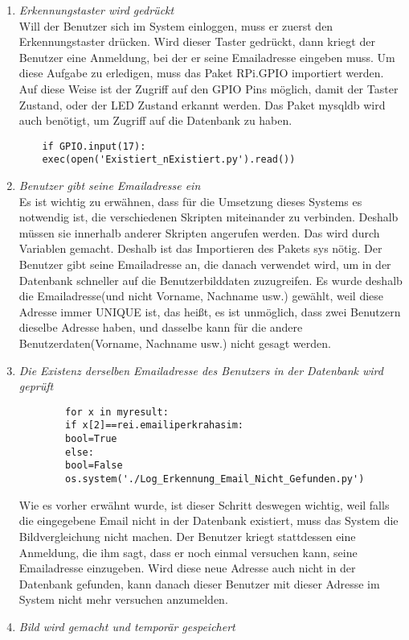 \begin{enumerate}
	
	\item \textit{Erkennungstaster wird gedr{\"u}ckt} \\
	
	Will der Benutzer sich im System einloggen, muss er zuerst den Erkennungstaster dr{\"u}cken. Wird dieser Taster gedr{\"u}ckt, dann kriegt der Benutzer eine Anmeldung, bei der er seine Emailadresse eingeben muss. Um diese Aufgabe zu erledigen, muss das Paket RPi.GPIO importiert werden. Auf diese Weise ist der Zugriff auf den GPIO Pins m{\"o}glich, damit der Taster Zustand, oder der LED Zustand erkannt werden. Das Paket mysqldb wird auch ben{\"o}tigt, um Zugriff auf die Datenbank zu haben.
	\begin{lstlisting}
	if GPIO.input(17):
	exec(open('Existiert_nExistiert.py').read()) 
	\end{lstlisting} 
	\item \textit{Benutzer gibt seine Emailadresse ein} \\
	
Es ist wichtig zu erw{\"a}hnen, dass für die Umsetzung dieses Systems es notwendig ist, die verschiedenen Skripten miteinander zu verbinden.  Deshalb müssen sie innerhalb anderer Skripten angerufen werden. Das wird durch Variablen gemacht. Deshalb ist das Importieren des Pakets sys n{\"o}tig. Der Benutzer gibt seine Emailadresse an, die danach verwendet wird, um in der Datenbank schneller auf die Benutzerbilddaten zuzugreifen. Es wurde deshalb die Emailadresse(und nicht Vorname, Nachname usw.) gewählt, weil diese Adresse immer UNIQUE ist, das heißt, es ist unmöglich, dass zwei Benutzern dieselbe Adresse haben, und dasselbe kann für die andere Benutzerdaten(Vorname, Nachname usw.) nicht gesagt werden.
\item \textit{Die Existenz derselben Emailadresse des Benutzers in der Datenbank wird geprüft} \\
	\begin{lstlisting}
		for x in myresult:
		if x[2]==rei.emailiperkrahasim:
		bool=True
		else:
		bool=False
		os.system('./Log_Erkennung_Email_Nicht_Gefunden.py')
	\end{lstlisting}
Wie es vorher erwähnt wurde, ist dieser Schritt deswegen wichtig, weil falls die eingegebene Email nicht in der Datenbank existiert, muss das System die Bildvergleichung nicht machen. Der Benutzer kriegt stattdessen eine Anmeldung, die ihm sagt, dass er noch einmal versuchen kann, seine Emailadresse einzugeben. Wird diese neue Adresse auch nicht in der Datenbank gefunden, kann danach dieser Benutzer mit dieser Adresse im System nicht mehr versuchen anzumelden. 
\item \textit{Bild wird gemacht und tempor{\"a}r gespeichert} \\


\end{enumerate}
